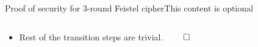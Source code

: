\documentclass[aspectratio=169, lualatex, handout]{beamer}
\begin{document}
	\begin{frame}{Proof of security for 3-round Feistel cipher}{This content is optional}
		\begin{columns}[c]
			\begin{column}{0.5\textwidth}
				\begin{itemize}
					\item Rest of the transition steps are trivial. $\qed$
				\end{itemize}
			\end{column}
			\begin{column}{0.5\textwidth}
				\begin{center}
				\end{center}
			\end{column}
		\end{columns}
	\end{frame}
\fi
\end{document}
